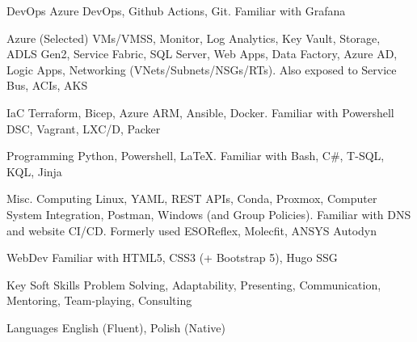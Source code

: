 \begin{cvskills}

  \cvskill
    {DevOps} 
    {Azure DevOps, Github Actions, Git. Familiar with Grafana} 

  \cvskill
    {Azure (Selected)} 
    {VMs/VMSS, Monitor, Log Analytics, Key Vault, Storage, ADLS Gen2, Service Fabric, SQL Server, Web Apps, Data Factory, Azure AD, Logic Apps, Networking (VNets/Subnets/NSGs/RTs). Also exposed to Service Bus, ACIs, AKS}

  \cvskill
    {IaC} 
    {Terraform, Bicep, Azure ARM, Ansible, Docker. Familiar with Powershell DSC, Vagrant, LXC/D, Packer} 

  \cvskill
    {Programming} 
    {Python, Powershell, \LaTeX. Familiar with Bash, C\#, T-SQL, KQL, Jinja}
    
  \cvskill
    {Misc. Computing} 
    {Linux, YAML, REST APIs, Conda, Proxmox, Computer System Integration, Postman, Windows (and Group Policies). Familiar with DNS and website CI/CD. Formerly used ESOReflex, Molecfit, ANSYS Autodyn} 

  \cvskill
    {WebDev} 
    {Familiar with HTML5, CSS3 (+ Bootstrap 5), Hugo SSG} 

  \cvskill
    {Key Soft Skills} 
    {Problem Solving, Adaptability, Presenting, Communication, Mentoring, Team-playing, Consulting} 

  \cvskill
    {Languages} 
    {English (Fluent), Polish (Native)} 
    
\end{cvskills}
